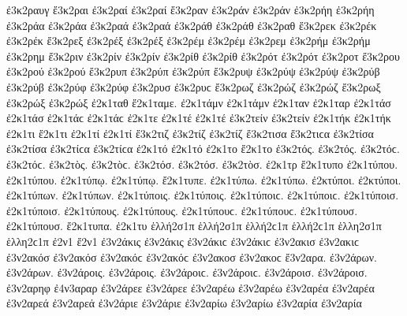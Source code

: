 {ἐ3κ2ραυγ 
ἔ3κ2ραι   %
ἐ3κ2ραί ἐ3κ2ραί 
ἔ3κ2ραν   %
ἐ3κ2ράν ἐ3κ2ράν 
ἐ3κ2ρήη ἐ3κ2ρήη   %
ἐ3κ2ράα ἐ3κ2ράα 
ἐ3κ2ραά ἐ3κ2ραά 
ἐ3κ2ράθ ἐ3κ2ράθ   %
ἐ3κ2ραθ 
ἔ3κ2ρεκ   %
ἐ3κ2ρέκ ἐ3κ2ρέκ 
ἔ3κ2ρεξ   %
ἐ3κ2ρέξ ἐ3κ2ρέξ 
ἐ3κ2ρέμ ἐ3κ2ρέμ   %
ἐ3κ2ρεμ 
ἐ3κ2ρήμ ἐ3κ2ρήμ   %
ἐ3κ2ρημ 
ἔ3κ2ριν   %
ἐ3κ2ρίν ἐ3κ2ρίν 
ἐ3κ2ρίθ ἐ3κ2ρίθ 
ἐ3κ2ρότ ἐ3κ2ρότ   %
ἐ3κ2ροτ 
ἔ3κ2ρου   %
ἐ3κ2ρού ἐ3κ2ρού 
ἔ3κ2ρυπ   %
ἐ3κ2ρύπ ἐ3κ2ρύπ   %
ἔ3κ2ρυψ 
ἐ3κ2ρύψ ἐ3κ2ρύψ 
ἐ3κ2ρύβ ἐ3κ2ρύβ 
ἐ3κ2ρύφ ἐ3κ2ρύφ 
ἐ3κ2ρυσ ἐ3κ2ρυϲ   %
ἔ3κ2ρωζ   %
ἐ3κ2ρώζ ἐ3κ2ρώζ 
ἔ3κ2ρωξ   %
ἐ3κ2ρώξ ἐ3κ2ρώξ 
ἐ2κ1ταθ   %
ἔ2κ1ταμε.   %
ἐ2κ1τάμν ἐ2κ1τάμν   %
ἐ2κ1ταν   %
ἐ2κ1ταρ   %
ἐ2κ1τάσ ἐ2κ1τάσ ἐ2κ1τάϲ ἐ2κ1τάϲ   %
ἐ2κ1τε 
ἐ2κ1τέ ἐ2κ1τέ 
ἐ3κ2τείν ἐ3κ2τείν   %
ἐ2κ1τήκ ἐ2κ1τήκ   %
ἐ2κ1τι 
ἔ2κ1τι 
ἐ2κ1τί ἐ2κ1τί 
ἔ3κ2τιζ   %
ἐ3κ2τίζ ἐ3κ2τίζ 
ἔ3κ2τισα ἔ3κ2τιϲα   %
ἐ3κ2τίσα ἐ3κ2τίσα ἐ3κ2τίϲα ἐ3κ2τίϲα 
ἐ2κ1τό ἐ2κ1τό 
ἐ2κ1το 
ἔ2κ1το 
ἐ3κ2τός. ἐ3κ2τός. ἐ3κ2τόϲ. ἐ3κ2τόϲ.   %
ἐ3κ2τὸς. ἐ3κ2τὸϲ. 
ἐ3κ2τόσ. ἐ3κ2τόσ. 
ἐ3κ2τὸσ. 
ἐ2κ1τρ 
ἔ2κ1τυπο   %
ἐ2κ1τύπου. ἐ2κ1τύπου. 
ἐ2κ1τύπῳ. ἐ2κ1τύπῳ. 
ἔ2κ1τυπε. 
ἐ2κ1τύπω. ἐ2κ1τύπω. 
ἐ2κτύποι. ἐ2κτύποι. 
ἐ2κ1τύπων. ἐ2κ1τύπων. 
ἐ2κ1τύποις. ἐ2κ1τύποις. ἐ2κ1τύποιϲ. ἐ2κ1τύποιϲ. 
ἐ2κ1τύποισ. ἐ2κ1τύποισ. 
ἐ2κ1τύπους. ἐ2κ1τύπους. ἐ2κ1τύπουϲ. ἐ2κ1τύπουϲ. 
ἐ2κ1τύπουσ. ἐ2κ1τύπουσ. 
ἔ2κ1τυπα. 
ἐ2κ1τυ 
ἑλλή2σ1π ἑλλή2σ1π ἑλλή2ϲ1π ἑλλή2ϲ1π   %
ἑλλη2σ1π ἑλλη2ϲ1π 
ἐ2ν1 
ἔ2ν1 
ἐ3ν2άκις ἐ3ν2άκις ἐ3ν2άκιϲ ἐ3ν2άκιϲ   %
ἐ3ν2ακισ ἐ3ν2ακιϲ   %
ἐ3ν2ακόσ ἐ3ν2ακόσ ἐ3ν2ακόϲ ἐ3ν2ακόϲ   %
ἐ3ν2ακοσ ἐ3ν2ακοϲ 
ἔ3ν2αρα.   %
ἐ3ν2άρων. ἐ3ν2άρων. 
ἐ3ν2άροις. ἐ3ν2άροις. ἐ3ν2άροιϲ. ἐ3ν2άροιϲ. 
ἐ3ν2άροισ. ἐ3ν2άροισ. 
ἐ3ν2αρηφ   %
ἐ4ν3αραρ   %
ἐ3ν2άρεε ἐ3ν2άρεε   %
ἐ3ν2αρέω ἐ3ν2αρέω 
ἐ3ν2αρέα ἐ3ν2αρέα   %
ἐ3ν2αρεά ἐ3ν2αρεά 
ἐ3ν2άριε ἐ3ν2άριε   %
ἐ3ν2αρίω ἐ3ν2αρίω 
ἐ3ν2αρία ἐ3ν2αρία   %
}
